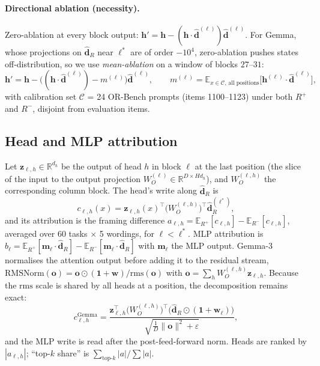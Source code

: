 \documentclass[10pt]{article}
\newcommand{\hR}{\hat{\bm{d}}_{R}}
\newcommand{\h}{\bm{h}}
\newcommand{\E}{\mathbb{E}}
\begin{document}
\paragraph{Directional ablation (necessity).} Zero-ablation at every block output: $\h'=\h-(\h\cdot\hat{\bm d}^{(\ell)})\hat{\bm d}^{(\ell)}$.
For Gemma, whose projections on $\hR$ near $\ell^{*}$ are of order $-10^{4}$, zero-ablation pushes states off-distribution, so we use
\emph{mean-ablation} on a window of blocks $27$--$31$:
\begin{equation}
\h'=\h-\big((\h\cdot\hat{\bm d}^{(\ell)})-m^{(\ell)}\big)\hat{\bm d}^{(\ell)},\qquad
m^{(\ell)}=\E_{x\in\mathcal{C},\,\text{all positions}}\big[\h^{(\ell)}\cdot\hat{\bm d}^{(\ell)}\big],
\label{eq:meanabl}
\end{equation}
with calibration set $\mathcal{C}$ = 24 OR-Bench prompts (items 1100--1123) under both $R^{+}$ and $R^{-}$, disjoint from evaluation items.

\subsection{Head and MLP attribution}
Let $\bm z_{\ell,h}\in\mathbb{R}^{d_h}$ be the output of head $h$ in block $\ell$ at the last position (the slice of the input to the output
projection $W_O^{(\ell)}\in\mathbb{R}^{D\times Hd_h}$), and $W_O^{(\ell,h)}$ the corresponding column block. The head's write along $\hR$ is
\begin{equation}
c_{\ell,h}(x)=\bm z_{\ell,h}(x)^{\top}\big(W_O^{(\ell,h)}\big)^{\!\top}\hR^{(\ell^*)},
\end{equation}
and its attribution is the framing difference $a_{\ell,h}=\E_{R^{+}}[c_{\ell,h}]-\E_{R^{-}}[c_{\ell,h}]$, averaged over 60 tasks $\times$ 5 wordings,
for $\ell<\ell^{*}$. MLP attribution is $b_\ell=\E_{R^{+}}[\bm m_\ell\cdot\hR]-\E_{R^{-}}[\bm m_\ell\cdot\hR]$ with $\bm m_\ell$ the MLP output.
Gemma-3 normalises the attention output before adding it to the residual stream,
$\mathrm{RMSNorm}(\bm o)=\bm o\odot(\bm 1+\bm w)/\mathrm{rms}(\bm o)$ with $\bm o=\sum_h W_O^{(\ell,h)}\bm z_{\ell,h}$. Because the
$\mathrm{rms}$ scale is shared by all heads at a position, the decomposition remains exact:
\begin{equation}
c^{\mathrm{Gemma}}_{\ell,h}=\frac{\bm z_{\ell,h}^{\top}\big(W_O^{(\ell,h)}\big)^{\!\top}\big(\hR\odot(\bm 1+\bm w_\ell)\big)}{\sqrt{\tfrac1D\|\bm o\|^2+\varepsilon}},
\end{equation}
and the MLP write is read after the post-feed-forward norm. Heads are ranked by $|a_{\ell,h}|$; ``top-$k$ share'' is
$\sum_{\text{top-}k}|a|/\sum|a|$.
\end{document}
